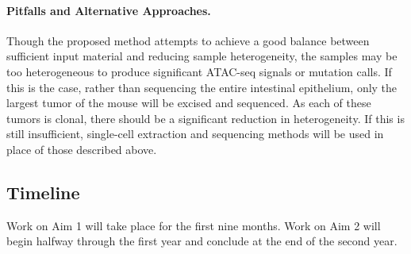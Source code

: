 \paragraph{Pitfalls and Alternative Approaches.}
Though the proposed method attempts to achieve a good balance between sufficient input material and reducing sample heterogeneity, the samples may be too heterogeneous to produce significant ATAC-seq signals or mutation calls. If this is the case, rather than sequencing the entire intestinal epithelium, only the largest tumor of the mouse will be excised and sequenced. As each of these tumors is clonal, there should be a significant reduction in heterogeneity. If this is still insufficient, single-cell extraction and sequencing methods will be used in place of those described above.

\subsection{Timeline}

Work on Aim 1 will take place for the first nine months. Work on Aim 2 will begin halfway through the first year and conclude at the end of the second year.


\clearpage

\printbibliography

